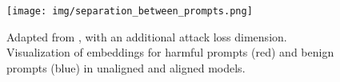 
\begin{figure}[H]
    \centering
    \texttt{[image: img/separation\_between\_prompts.png]}
    \caption{Adapted from \citep{Yu2024EnhancingJA}, with an additional attack loss dimension. Visualization of embeddings for harmful prompts (red) and benign prompts (blue) in unaligned and aligned models.}
    \label{fig:spaces_empricially}
\end{figure}


